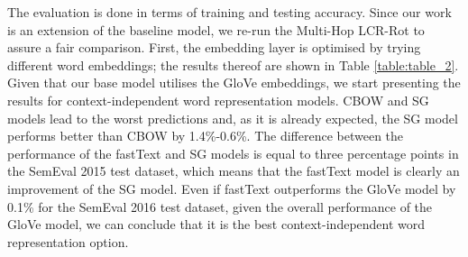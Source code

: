 \documentclass[hidelinks]{llncs}
\begin{document}
\begin{table}[!htp]
\footnotesize
\centering
\setlength{\tabcolsep}{0pt} \caption{\footnotesize {Comparison of word embeddings for the Multi-Hop LCR-Rot model using accuracy. The best results are given in bold font.}}
\label{table:table_2}
\vspace{-0.5cm}
\end{table}

The evaluation is done in terms of training and testing accuracy. Since our work is an extension of the baseline model, we re-run the Multi-Hop LCR-Rot to assure a fair comparison. First, the embedding layer is optimised by trying different word embeddings; the results thereof are shown in Table \ref{table:table_2}. Given that our base model \cite{wallaart2019hybrid} utilises the GloVe embeddings, we start presenting the results for context-independent word representation models. CBOW and SG models lead to the worst predictions and, as it is already expected, the SG model performs better than CBOW by 1.4\%-0.6\%.
The difference between the performance of the fastText and SG models is equal to three percentage points in the SemEval 2015 test dataset, which means that the fastText model is clearly an improvement of the SG model. Even if fastText outperforms the GloVe model by 0.1\% for the SemEval 2016 test dataset, given the overall performance of the GloVe model, we can conclude that it is the best context-independent word representation option. 
\end{document}
